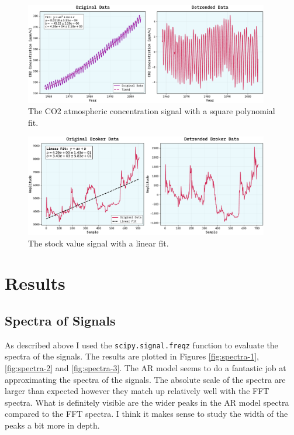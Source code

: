 \documentclass[10pt, titlepage, a4paper]{article}
\begin{document}
\begin{figure}[H]
    \centering
    \includegraphics[width=0.95\textwidth]{../MaxEntropy/Images/detrended-co2.pdf}
    \caption{The CO2 atmospheric concentration signal with a square polynomial fit.}
    \label{fig:detrended-1}
\end{figure}

\begin{figure}[H]
    \centering
    \includegraphics[width=0.95\textwidth]{../LinForecast/Images/borza-detrended.pdf}
    \caption{The stock value signal with a linear fit.}
    \label{fig:detrended-2}
\end{figure}

\section{Results}
\subsection{Spectra of Signals}
As described above I used the \texttt{scipy.signal.freqz} function to evaluate the spectra of the signals. The results 
are plotted in Figures \ref{fig:spectra-1}, \ref{fig:spectra-2} and \ref{fig:spectra-3}. The AR model seems to do a 
fantastic job at approximating the spectra of the signals. The absolute scale of the spectra are larger than expected however 
they match up relatively well with the FFT spectra. What is definitely visible are the wider peaks in the AR model spectra 
compared to the FFT spectra. I think it makes sense to study the width of the peaks a bit more in depth.
\end{document}
